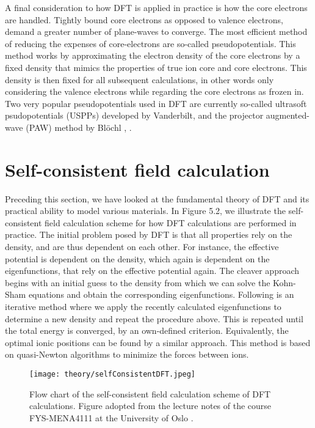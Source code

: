 A final consideration to how DFT is applied in practice is how the core electrons are handled. Tightly bound core electrons as opposed to valence electrons, demand a greater number of plane-waves to converge. The most efficient method of reducing the expenses of core-electrons are so-called pseudopotentials. This method works by approximating the electron density of the core electrons by a fixed density that mimics the properties of true ion core and core electrons. This density is then fixed for all subsequent calculations, in other words only considering the valence electrons while regarding the core electrons as frozen in. Two very popular pseudopotentials used in DFT are currently so-called ultrasoft psudopotentials (USPPs) developed by Vanderbilt, and the projector augmented-wave (PAW) method by Bl\"{o}chl \cite{PAW1}, \cite{PAW2}.

\section{Self-consistent field calculation}

Preceding this section, we have looked at the fundamental theory of DFT and its practical ability to model various materials. In Figure 5.2, we illustrate the self-consistent field calculation scheme for how DFT calculations are performed in practice. The initial problem posed by DFT is that all properties rely on the density, and are thus dependent on each other. For instance, the effective potential is dependent on the density, which again is dependent on the eigenfunctions, that rely on the effective potential again. The cleaver approach begins with an initial guess to the density from which we can solve the Kohn-Sham equations and obtain the corresponding eigenfunctions. Following is an iterative method where we apply the recently calculated eigenfunctions to determine a new density and repeat the procedure above. This is repeated until the total energy is converged, by an own-defined criterion. Equivalently, the optimal ionic positions can be found by a similar approach. This method is based on quasi-Newton algorithms to minimize the forces between ions. 

\begin{figure}[H]
\centering
\texttt{[image: theory/selfConsistentDFT.jpeg]}
\caption{Flow chart of the self-consistent field calculation scheme of DFT calculations. Figure adopted from the lecture notes of the course FYS-MENA4111 at the University of Oslo \cite{persson2020}.}
\end{figure}


